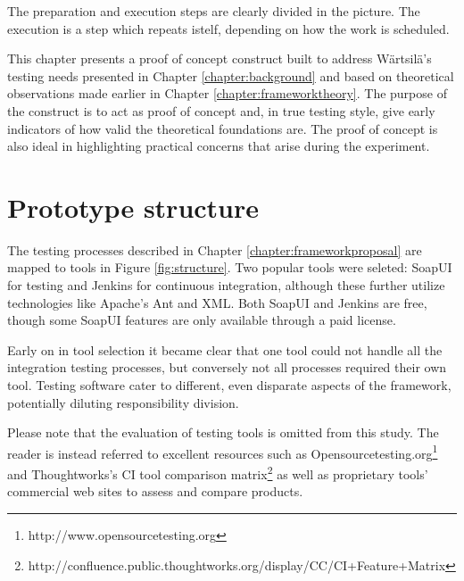\documentclass[12pt,a4paper,oneside,pdftex]{report}
\begin{document}
{The preparation and execution steps are clearly divided in the picture. The execution is a step which repeats istelf, depending on how the work is scheduled.



This chapter presents a proof of concept construct built to address Wärtsilä's testing needs presented in Chapter \ref{chapter:background} and based on theoretical observations made earlier in Chapter \ref{chapter:frameworktheory}. The purpose of the construct is to act as proof of concept and, in true testing style, give early indicators of how valid the theoretical foundations are. The proof of concept is also ideal in highlighting practical concerns that arise during the experiment.

\section{Prototype structure}


The testing processes described in Chapter \ref{chapter:frameworkproposal} are mapped to tools in Figure \ref{fig:structure}. Two popular tools were seleted: SoapUI for testing and Jenkins for continuous integration, although these further utilize technologies like Apache's Ant and XML. Both SoapUI and Jenkins are free, though some SoapUI features are only available through a paid license.

Early on in tool selection it became clear that one tool could not handle all the integration testing processes, but conversely not all processes required their own tool. Testing software cater to different, even disparate aspects of the framework, potentially diluting responsibility division.

Please note that the evaluation of testing tools is omitted from this study. The reader is instead referred to excellent resources such as Opensourcetesting.org\footnote{http://www.opensourcetesting.org} and Thoughtworks's CI tool comparison matrix\footnote{http://confluence.public.thoughtworks.org/display/CC/CI+Feature+Matrix} as well as proprietary tools' commercial web sites to assess and compare products.

}
\end{document}
